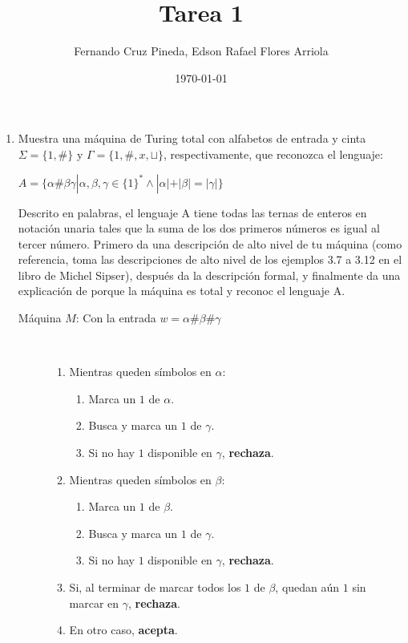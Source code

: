 \documentclass{article}
\title{Tarea 1}
\author{Fernando Cruz Pineda, Edson Rafael Flores Arriola}
\date{\today}
\begin{document}
\maketitle

\begin{enumerate}
\item Muestra una máquina de Turing total con alfabetos de entrada y cinta $\Sigma = \{1,\#\}$ y  $\Gamma=\{1,\#,x,\sqcup \}$, respectivamente, que reconozca el lenguaje:

  $A = \{\alpha \# \beta \gamma | \alpha,\beta,\gamma \in \{1\}^* \land |\alpha| + |\beta| = |\gamma| \}$

  Descrito en palabras, el lenguaje A tiene todas las ternas de enteros en notación unaria tales
que la suma de los dos primeros números es igual al tercer número.
Primero da una descripción de alto nivel de tu máquina (como referencia, toma las descripciones de alto nivel de los ejemplos 3.7 a 3.12 en el libro de Michel Sipser), después da la descripción formal, y finalmente da una explicación de porque la máquina es total y reconoc el lenguaje A.

\begin{description}
\item[Máquina $M$: Con la entrada $w= \alpha \# \beta \# \gamma$] 
\\
   \begin{enumerate}
    \item Mientras queden símbolos en $\alpha$:  
      \begin{enumerate}
        \item Marca un $1$ de $\alpha$.  
        \item Busca y marca un $1$ de $\gamma$.  
        \item Si no hay $1$ disponible en $\gamma$, \textbf{rechaza}.  
      \end{enumerate}
    \item Mientras queden símbolos en $\beta$:  
      \begin{enumerate}
        \item Marca un $1$ de $\beta$.  
        \item Busca y marca un $1$ de $\gamma$.  
        \item Si no hay $1$ disponible en $\gamma$, \textbf{rechaza}.  
      \end{enumerate}
    \item Si, al terminar de marcar todos los $1$ de $\beta$, quedan aún $1$ sin marcar en $\gamma$, \textbf{rechaza}.  
    \item En otro caso, \textbf{acepta}.  
  \end{enumerate}
\end{description}


\end{enumerate}
\end{document}
